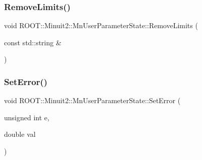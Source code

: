 \subsubsection{\texorpdfstring{RemoveLimits()}{RemoveLimits()}\hspace{0.1cm}{\footnotesize\ttfamily [6/6]}}
{\footnotesize\ttfamily void R\+O\+O\+T\+::\+Minuit2\+::\+Mn\+User\+Parameter\+State\+::\+Remove\+Limits (\begin{DoxyParamCaption}\item[{const std\+::string \&}]{ }\end{DoxyParamCaption})}

\mbox{\label{classROOT_1_1Minuit2_1_1MnUserParameterState_adf2a80e9887b97dcc01b65184281aaa5}} 
\subsubsection{\texorpdfstring{SetError()}{SetError()}\hspace{0.1cm}{\footnotesize\ttfamily [1/6]}}
{\footnotesize\ttfamily void R\+O\+O\+T\+::\+Minuit2\+::\+Mn\+User\+Parameter\+State\+::\+Set\+Error (\begin{DoxyParamCaption}\item[{unsigned int}]{e,  }\item[{double}]{val }\end{DoxyParamCaption})}

